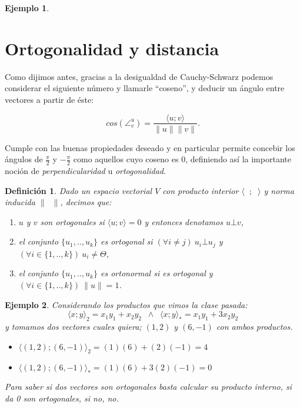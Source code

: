 \documentclass[12pt]{book}
\newtheorem{defi}{Definici\'on}
\newtheorem{ejem}{Ejemplo}
\begin{document}
{\begin{ejem}
{}
\end{ejem}

\section{Ortogonalidad y distancia}


Como dijimos antes, gracias a la desigualdad de Cauchy-Schwarz podemos considerar el siguiente número y llamarle ``coseno'', y deducir un ángulo entre vectores a partir de éste:

$$cos(\angle^u_v)=\frac{\langle u; v\rangle}{\|u\| \|v\|}.$$

Cumple con las buenas propiedades deseado y en particular permite concebir los ángulos de $\frac{\pi}{2}$ y $-\frac{\pi}{2}$ como aquellos cuyo coseno es 0, definiendo así la importante noción de \emph{perpendicularidad} u \emph{ortogonalidad}.

 

\begin{defi}
Dado un espacio vectorial $V$ con producto interior $\langle\phantom{x};\phantom{x}\rangle$ y norma inducida $\|\phantom{x}\|$, decimos que:

\begin{enumerate}
\item \emph{$u$ y $v$ son ortogonales} si $\langle u;v \rangle=0$ y entonces denotamos $u\bot v$,
\item \emph{el conjunto $\{u_1,..,u_k\}$ es ortogonal} si $(\forall i\not = j)\ u_i\bot u_j$ y $(\forall i\in\{1,..,k\})\ u_i\not= \Theta$,
\item \emph{el conjunto $\{u_1,..,u_k\}$ es ortonormal} si es ortogonal y $(\forall i\in\{1,..,k\})\ \|u\|=1$.
\end{enumerate}
\end{defi}

\begin{ejem} {\em
    Considerando los productos que vimos la clase pasada:
    $$\langle x;y\rangle_2=x_1y_1+x_2y_2\;\;\wedge\;\;\langle x;y\rangle_*=x_1y_1+3x_2y_2$$
    y tomamos dos vectores cuales quiera; $(1,2)$ y $(6,-1)$ con ambos productos.
    \begin{itemize}
    \item $\langle (1,2);(6,-1)\rangle_2=(1)(6)+(2)(-1)=4$
    \item $\langle (1,2);(6,-1)\rangle_*=(1)(6)+3(2)(-1)=0$
    \end{itemize}
    Para saber si dos vectores son ortogonales basta calcular su producto interno, si da 0 son ortogonales, si no, no.
    
}
\end{ejem}}
\end{document}
